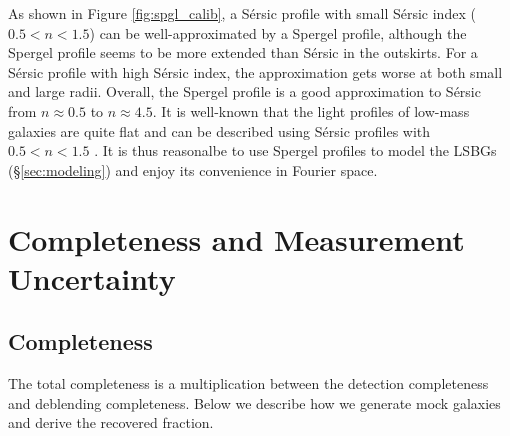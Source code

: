 \documentclass[twocolumn,astrosymb,twocolappendix]{aastex631}
\newcommand{\sersic}{S\'ersic}
\begin{document}
\begin{CJK*}{UTF8}{gbsn}
As shown in Figure \ref{fig:spgl_calib}, a \sersic{} profile with small \sersic{} index ($0.5 < n < 1.5$) can be well-approximated by a Spergel profile, although the Spergel profile seems to be more extended than \sersic{} in the outskirts. For a \sersic{} profile with high \sersic{} index, the approximation gets worse at both small and large radii. Overall, the Spergel profile is a good approximation to \sersic{} from $n\approx 0.5$ to $n\approx 4.5$. It is well-known that the light profiles of low-mass galaxies are quite flat and can be described using \sersic{} profiles with $0.5 < n < 1.5$ \citep[e.g.,][]{vanDokkum2015,Lange2015,Greco2018,Zaritsky2021,ELVES-I}. It is thus reasonalbe to use Spergel profiles to model the LSBGs (\S\ref{sec:modeling}) and enjoy its convenience in Fourier space. 

\section{Completeness and Measurement Uncertainty}\label{ap:comp_meas_unc}
\subsection{Completeness}
The total completeness is a multiplication between the detection completeness and deblending completeness. Below we describe how we generate mock galaxies and derive the recovered fraction. 


\end{CJK*}
\end{document}
